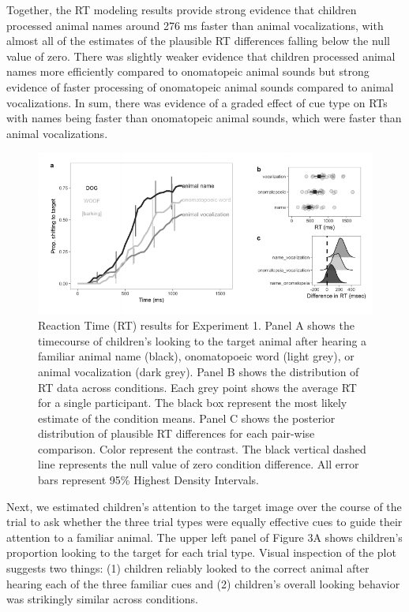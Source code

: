 \documentclass[english,floatsintext,man]{apa6}
\theoremstyle{definition}
\theoremstyle{definition}
\theoremstyle{definition}
\theoremstyle{remark}
\begin{document}
Together, the RT modeling results provide strong evidence that children
processed animal names around 276 ms faster than animal vocalizations,
with almost all of the estimates of the plausible RT differences falling
below the null value of zero. There was slightly weaker evidence that
children processed animal names more efficiently compared to onomatopeic
animal sounds but strong evidence of faster processing of onomatopeic
animal sounds compared to animal vocalizations. In sum, there was
evidence of a graded effect of cue type on RTs with names being faster
than onomatopeic animal sounds, which were faster than animal
vocalizations.

\begin{figure}[t]

{\centering \includegraphics[width=0.95\linewidth]{anime_manuscript_files/figure-latex/oc-plot-e1-1} 

}

\caption{Reaction Time (RT) results for Experiment 1. Panel A shows the timecourse of children’s looking to the target animal after hearing a familiar animal name (black), onomatopoeic word (light grey), or animal vocalization (dark grey). Panel B shows the distribution of RT data across conditions. Each grey point shows the average RT for a single participant. The black box represent the most likely estimate of the condition means. Panel C shows the posterior distribution of plausible RT differences for each pair-wise comparison. Color represent the contrast. The black vertical dashed line represents the null value of zero condition difference. All error bars represent 95\% Highest Density Intervals.}\label{fig:oc-plot-e1}
\end{figure}

Next, we estimated children's attention to the target image over the
course of the trial to ask whether the three trial types were equally
effective cues to guide their attention to a familiar animal. The upper
left panel of Figure 3A shows children's proportion looking to the
target for each trial type. Visual inspection of the plot suggests two
things: (1) children reliably looked to the correct animal after hearing
each of the three familiar cues and (2) children's overall looking
behavior was strikingly similar across conditions.
\end{document}
